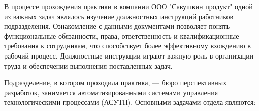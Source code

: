 {\gostFont

  \par \redline В процессе прохождения практики в компании ООО "Савушкин продукт" одной из важных задач являлось изучение должностных инструкций работников подразделения. Ознакомление с данными документами позволяет понять функциональные обязанности, права, ответственность и квалификационные требования к сотрудникам, что способствует более эффективному вхождению в рабочий процесс. Должностные инструкции играют важную роль в организации труда и обеспечении выполнения поставленных задач. 

  \par \redline Подразделение, в котором проходила практика, — бюро перспективных разработок, занимается автоматизированными системами управления технологическими процессами (АСУТП). Основными задачами отдела являются:

}
